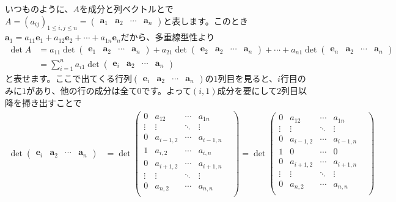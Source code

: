 いつものように、$A$を成分と列ベクトルとで$A = (a_{ij})_{1 \leq i, j \leq n} = \begin{pmatrix} \bm{a}_1 & \bm{a}_2 & \cdots & \bm{a}_n \end{pmatrix}$と表します。このとき$\bm{a}_1 = a_{11} \bm{e}_1 + a_{12} \bm{e}_2 + \cdots + a_{1n} \bm{e}_n$だから、多重線型性より
\begin{align*}
\det A &= a_{11} \det
\begin{pmatrix}
\bm{e}_1 & \bm{a}_{2} & \cdots & \bm{a}_n
\end{pmatrix}
+
a_{21} \det
\begin{pmatrix}
\bm{e}_2 & \bm{a}_{2} & \cdots & \bm{a}_n
\end{pmatrix}
+ \cdots +
a_{n1} \det
\begin{pmatrix}
\bm{e}_n & \bm{a}_{2} & \cdots & \bm{a}_n
\end{pmatrix} \\
&= \sum_{i = 1}^n a_{i1} \det 
\begin{pmatrix}
\bm{e}_i & \bm{a}_{2} & \cdots & \bm{a}_n
\end{pmatrix}
\end{align*}
と表せます。ここで出てくる行列$\begin{pmatrix} \bm{e}_i & \bm{a}_{2} & \cdots & \bm{a}_n \end{pmatrix}$の$1$列目を見ると、$i$行目のみに$1$があり、他の行の成分は全て$0$です。よって$(i, 1)$成分を要にして$2$列目以降を掃き出すことで
\begin{align*}
\det \begin{pmatrix}
\bm{e}_i & \bm{a}_{2} & \cdots & \bm{a}_n
\end{pmatrix}
&= \det \begin{pmatrix}
0 & a_{12} & \cdots & a_{1n} \\
\vdots & \vdots & \ddots & \vdots &  \\
0 & a_{i - 1, 2} & \cdots & a_{i - 1, n} \\
1 & a_{i, 2} & \cdots & a_{i, n} \\
0 & a_{i + 1, 2} & \cdots & a_{i + 1, n} \\
\vdots & \vdots & \ddots & \vdots \\
0 & a_{n, 2} & \cdots & a_{n, n} \\
\end{pmatrix}
=
\det \begin{pmatrix}
0 & a_{12} & \cdots & a_{1n} \\
\vdots & \vdots & \ddots & \vdots &  \\
0 & a_{i - 1, 2} & \cdots & a_{i - 1, n} \\
1 & 0 & \cdots & 0 \\
0 & a_{i + 1, 2} & \cdots & a_{i + 1, n} \\
\vdots & \vdots & \ddots & \vdots \\
0 & a_{n, 2} & \cdots & a_{n, n} \\
\end{pmatrix}
\end{align*}
